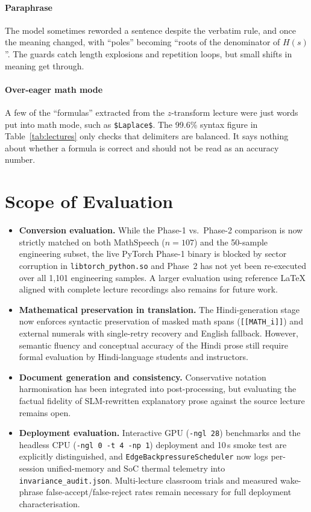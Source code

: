 \documentclass[11pt,a4paper,oneside]{report}
\theoremstyle{definition}
\newcommand{\code}[1]{\texttt{\small #1}}
\begin{document}
\paragraph{Paraphrase} The model sometimes reworded a sentence despite the verbatim rule, and once the meaning changed, with ``poles'' becoming ``roots of the denominator of $H(s)$''. The guards catch length explosions and repetition loops, but small shifts in meaning get through.

\paragraph{Over-eager math mode} A few of the ``formulas'' extracted from the $z$-transform lecture were just words put into math mode, such as \verb|$Laplace$|. The 99.6\% syntax figure in Table~\ref{tab:lectures} only checks that delimiters are balanced. It says nothing about whether a formula is correct and should not be read as an accuracy number.

\section{Scope of Evaluation}
\label{sec:limits}
\begin{itemize}
  \item \textbf{Conversion evaluation.} While the Phase-1 vs.\ Phase-2 comparison is now strictly matched on both MathSpeech ($n=107$) and the 50-sample engineering subset, the live PyTorch Phase-1 binary is blocked by sector corruption in \code{libtorch\_python.so} and Phase~2 has not yet been re-executed over all 1{,}101 engineering samples. A larger evaluation using reference LaTeX aligned with complete lecture recordings also remains for future work.
  \item \textbf{Mathematical preservation in translation.} The Hindi-generation stage now enforces syntactic preservation of masked math spans (\code{[[MATH\_i]]}) and external numerals with single-retry recovery and English fallback. However, semantic fluency and conceptual accuracy of the Hindi prose still require formal evaluation by Hindi-language students and instructors.
  \item \textbf{Document generation and consistency.} Conservative notation harmonisation has been integrated into post-processing, but evaluating the factual fidelity of SLM-rewritten explanatory prose against the source lecture remains open.
  \item \textbf{Deployment evaluation.} Interactive GPU (\code{-ngl 28}) benchmarks and the headless CPU (\code{-ngl 0 -t 4 -np 1}) deployment and 10\,s smoke test are explicitly distinguished, and \code{EdgeBackpressureScheduler} now logs per-session unified-memory and SoC thermal telemetry into \code{invariance\_audit.json}. Multi-lecture classroom trials and measured wake-phrase false-accept/false-reject rates remain necessary for full deployment characterisation.
\end{itemize}
\end{document}
